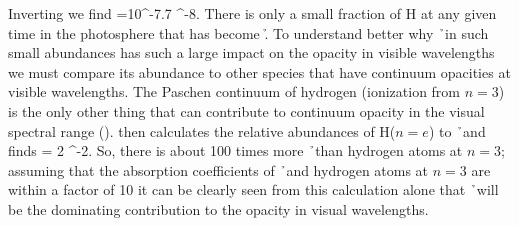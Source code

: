 Inverting we find 
\beq
{}=10^{-7.7}  ^{-8}.
\eeq
There is only a small fraction of H at any given time in the
photosphere that has become \h.  To understand better why \h\ in such
small abundances has such a large impact on the opacity in visible
wavelengths we must compare its abundance to other species that have
continuum opacities at visible wavelengths.  The Paschen continuum of
hydrogen (ionization from $n=3$) is the only other thing that can contribute
to continuum opacity in the visual spectral range
(\citealt{boehm1989}).  \cite{boehm1989} then calculates the relative
abundances of H($n=e$) to \h\ and finds
\beq
{} = 2 ^{-2}.
\eeq
So, there is about 100 times more \h\ than hydrogen atoms at $n=3$;
assuming that the absorption coefficients of \h\ and  hydrogen atoms
at $n=3$ are within a factor of 10 it can be clearly seen from this
calculation alone that \h\ will be the dominating contribution to the
opacity in visual wavelengths.

